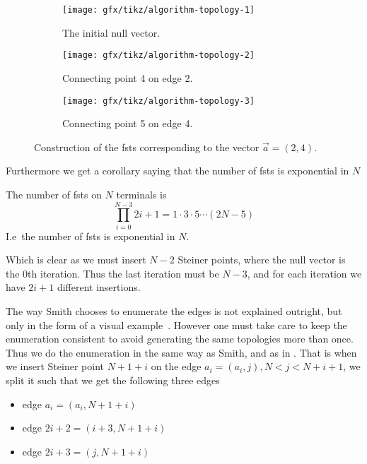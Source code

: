 \begin{figure}[htbp]
\centering
  \begin{subfigure}[t]{0.3\textwidth}
    \texttt{[image: gfx/tikz/algorithm-topology-1]}
    \caption{The initial null vector.\label{fig:algorithm-topology-1}}
  \end{subfigure}
  \hfill
  \begin{subfigure}[t]{0.3\textwidth}
    \texttt{[image: gfx/tikz/algorithm-topology-2]}
    \caption{Connecting point 4 on edge 2.\label{fig:algorithm-topology-2}}
  \end{subfigure}
  \hfill
  \begin{subfigure}[t]{0.3\textwidth}
    \texttt{[image: gfx/tikz/algorithm-topology-3]}
    \caption{Connecting point 5 on edge 4.\label{fig:algorithm-topology-3}}
  \end{subfigure}
  \caption[Construction of FSTs]{Construction of the \glspl{fst} corresponding
    to the vector $\vec{a} = (2, 4)$.\label{fig:algorithm-topologies}}
\end{figure}

Furthermore we get a corollary saying that the number of \glspl{fst} is
exponential in $N$

\begin{corollary}
\label{cor:number-of-fsts}
The number of \glspl{fst} on $N$ terminals is
\[\prod_{i=0}^{N-3} 2i+1 = 1 \cdot 3 \cdot 5 \cdots (2N -
5)\] I.e\ the number of \glspl{fst} is exponential in $N$.
\end{corollary}

Which is clear as we must insert $N-2$ Steiner points, where the null vector is
the $0$th iteration. Thus the last iteration must be $N-3$, and for each
iteration we have $2i+1$ different insertions.

The way Smith chooses to enumerate the edges is not explained outright, but only
in the form of a visual example~\cite{Smith1992}. However one must take care to
keep the enumeration consistent to avoid generating the same topologies more
than once. Thus we do the enumeration in the same way as Smith, and as in
. That is when we insert Steiner point $N+1+i$ on
the edge $a_{i} = (a_{i}, j), N < j < N+i+1$, we split it such that we get the
following three edges
%
\begin{itemize}
\item edge $a_{i} = (a_{i},N+1+i)$
\item edge $ 2i + 2 = (i+3,N+1+i)$
\item edge $ 2i + 3 = (j,N+1+i)$
\end{itemize}

